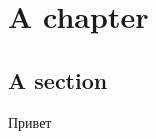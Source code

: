 \documentclass[14pt,a4paper,report]{report}
\begin{document}
\chapter{A chapter}
\lipsum[1]
\section{A section}
\lipsum[2]
Привет
\end{document}
